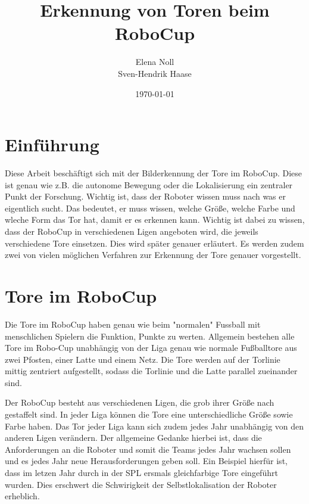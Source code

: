 \documentclass[a4paper,12pt]{article}
\begin{document}
\renewcommand\bibname{Referenzen}
\renewcommand\refname{Referenzen}

\begin{titlepage}
\author{Elena Noll\\
		Sven-Hendrik Haase}
\title{Erkennung von Toren beim RoboCup} 
\date{\today} 
\maketitle
\thispagestyle{empty}
\end{titlepage}

\tableofcontents

\newpage

\section{Einführung}
Diese Arbeit beschäftigt sich mit der Bilderkennung der Tore im RoboCup.
Diese ist genau wie z.B. die autonome Bewegung oder die Lokalisierung ein zentraler Punkt der Forschung.
Wichtig ist, dass der Roboter wissen muss nach was er eigentlich sucht. Das bedeutet, er muss wissen, welche Größe, welche Farbe und wleche Form das Tor hat, damit er es erkennen kann.
Wichtig ist dabei zu wissen, dass der RoboCup in verschiedenen Ligen
angeboten wird, die jeweils verschiedene Tore einsetzen. Dies wird später
genauer erläutert. Es werden zudem zwei von vielen möglichen Verfahren zur Erkennung
der Tore genauer vorgestellt.

\section{Tore im RoboCup}
Die Tore im RoboCup haben genau wie beim "normalen" Fussball mit menschlichen
Spielern die Funktion, Punkte zu werten.
Allgemein bestehen alle Tore im Robo-Cup unabhängig von der Liga genau wie normale Fußballtore aus zwei Pfosten, einer Latte und einem Netz. Die Tore werden auf der Torlinie mittig zentriert aufgestellt, sodass die Torlinie und die Latte parallel zueinander sind.

Der RoboCup besteht aus verschiedenen Ligen, die grob ihrer Größe nach
gestaffelt sind. In jeder Liga können die Tore eine unterschiedliche Größe sowie Farbe haben. Das Tor jeder Liga kann sich zudem jedes Jahr unabhängig von den
anderen Ligen verändern. Der allgemeine Gedanke hierbei ist, dass die
Anforderungen an die Roboter und somit die Teams jedes Jahr wachsen sollen und es jedes Jahr neue Herausforderungen geben soll. Ein Beispiel hierfür ist, dass im letzen Jahr durch in der SPL ersmals gleichfarbige Tore eingeführt wurden.
Dies erschwert die Schwirigkeit der Selbstlokalisation der Roboter erheblich.
\end{document}
